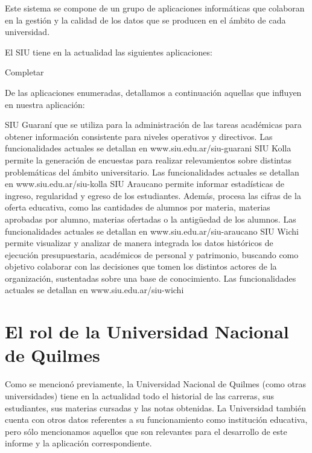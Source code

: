 Este sistema se compone de un grupo de aplicaciones informáticas que colaboran en la gestión y la calidad de los datos que se producen en el ámbito de cada universidad.

El SIU tiene en la actualidad las siguientes aplicaciones:

\begin{outline}
    \2 Completar
\end{outline}

De las aplicaciones enumeradas, detallamos a continuación aquellas que influyen en nuestra aplicación:

\begin{outline}
    \1 SIU Guaraní que se utiliza para la administración de las tareas académicas para obtener información consistente para niveles operativos y directivos. Las funcionalidades actuales se detallan en www.siu.edu.ar/siu-guarani
    \1 SIU Kolla permite la generación de encuestas para realizar relevamientos sobre distintas problemáticas del ámbito universitario. Las funcionalidades actuales se detallan en www.siu.edu.ar/siu-kolla
    \1 SIU Araucano permite informar estadísticas de ingreso, regularidad y egreso de los estudiantes. Además, procesa las cifras de la oferta educativa, como las cantidades de alumnos por materia, materias aprobadas por alumno, materias ofertadas o la antigüedad de los alumnos. Las funcionalidades actuales se detallan en www.siu.edu.ar/siu-araucano
    \1 SIU Wichi permite visualizar y analizar de manera integrada los datos históricos de ejecución presupuestaria, académicos de personal y patrimonio, buscando como objetivo colaborar con las decisiones que tomen los distintos actores de la organización, sustentadas sobre una base de conocimiento. Las funcionalidades actuales se detallan en www.siu.edu.ar/siu-wichi
\end{outline}

\section[El rol de la Universidad Nacional de Quilmes]{El rol de la Universidad Nacional de Quilmes}

Como se mencionó previamente, la Universidad Nacional de Quilmes (como otras universidades) tiene en la actualidad todo el historial de las carreras, sus estudiantes, sus materias cursadas y las notas obtenidas. La Universidad también cuenta con otros datos referentes a su funcionamiento como institución educativa, pero sólo mencionamos aquellos que son relevantes para el desarrollo de este informe y la aplicación correspondiente.

